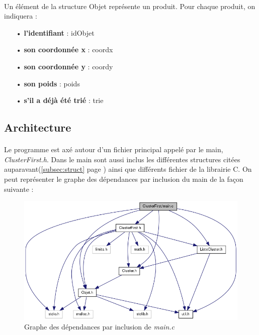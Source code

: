 \documentclass[twoside,UTF8]{EPURapport}
\begin{document}
\paragraph{}
Un élément de la structure Objet représente un produit. Pour chaque produit, on indiquera : 
\begin{itemize}
\item[•]\textbf{l'identifiant} : idObjet
\item[•]\textbf{son coordonnée x} : coordx
\item[•]\textbf{son coordonnée y} : coordy 
\item[•]\textbf{son poids} : poids
\item[•]\textbf{s'il a déjà été trié} : trie
\end{itemize}


\subsection{Architecture}

\paragraph{}
Le programme est axé autour d'un fichier principal appelé par le main, \textit{ClusterFirst.h}. Dans le main sont aussi inclus les différentes structures citées auparavant(\ref{subsec:struct} page \pageref{subsec:struct}) ainsi que différents fichier de la librairie C. 
On peut représenter le graphe des dépendances par inclusion du main de la façon suivante : 

\begin{figure}[!h]
	\center
	\includegraphics[scale=0.5]{images/main_inclusion.png}
	\caption{Graphe des dépendances par inclusion de \textit{main.c}}
\end{figure} 
\end{document}
